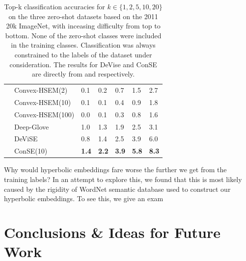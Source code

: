 \documentclass[12pt]{report}
\begin{document}
\begin{table}[]
\begin{tabular}{cllllll}
  \multicolumn{1}{l}{} & Convex-HSEM(2) & 0.1 & 0.2 & 0.7 & 1.5 & 2.7 \\
  \multicolumn{1}{l}{} & Convex-HSEM(10) & 0.1 & 0.1 & 0.4 & 0.9 & 1.8 \\
  \multicolumn{1}{l}{} & Convex-HSEM(100) & 0.0 & 0.1 & 0.3 & 0.8 & 1.6 \\
  \multicolumn{1}{l}{} & Deep-Glove & 1.0 & 1.3  & 1.9 & 2.5 & 3.1 \\
  \multicolumn{1}{l}{} & DeViSE & 0.8 & 1.4 & 2.5 & 3.9 & 6.0 \\
  \multicolumn{1}{l}{} & ConSE(10) & \textbf{1.4} & \textbf{2.2} & \textbf{3.9} & \textbf{5.8} & \textbf{8.3} \\ \hline
\end{tabular}
\caption{Top-k classification accuracies for $k \in \{1, 2, 5, 10, 20 \}$ on the three zero-shot datasets based on the 2011 20k ImageNet, with inceasing difficulty from top to bottom. None of the zero-shot classes were included in the training classes. Classification was always constrained to the labels of the dataset under consideration. The results for DeVise and ConSE are directly from \cite{Frome2013} and \cite{Norouzi2013} respectively.}
\label{tbl:zslres}
\end{table}

Why would hyperbolic embeddings fare worse the further we get from the training labels? In an attempt to explore this, we found that this is most likely caused by the rigidity of WordNet semantic database used to construct our hyperbolic embeddings. To see this, we give an exam


































\newpage
\chapter{Conclusions \& Ideas for Future Work}
\end{document}
